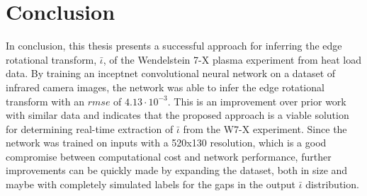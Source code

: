 %
\chapter{Conclusion}
\label{sec:conclusion}

In conclusion, this thesis presents a successful approach for inferring the edge rotational transform, $\bar{\iota}$, of the Wendelstein 7-X plasma experiment from heat load data. By training an inceptnet convolutional neural network on a dataset of infrared camera images, the network was able to infer the edge rotational transform with an $rmse$ of $4.13 \cdot 10^{-3}$. This is an improvement over prior work with similar data and indicates that the proposed approach is a viable solution for determining real-time extraction of $\bar{\iota}$ from the W7-X experiment. Since the network was trained on inputs with a 520x130 resolution, which is a good compromise between computational cost and network performance, further improvements can be quickly made by expanding the dataset, both in size and maybe with completely simulated labels for the gaps in the output $\bar{\iota}$ distribution.